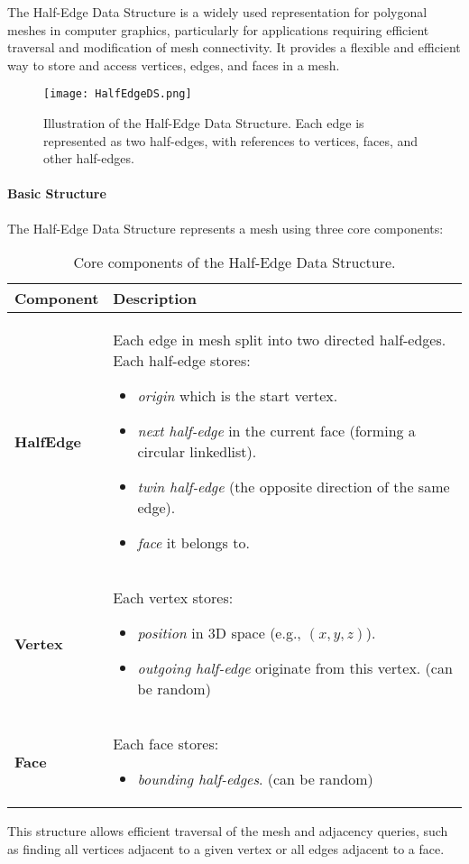 \documentclass[12pt]{extarticle}
\begin{document}
The Half-Edge Data Structure is a widely used representation for polygonal meshes in computer graphics, particularly for applications 
requiring efficient traversal and modification of mesh connectivity. It provides a flexible and efficient way to store and access vertices, 
edges, and faces in a mesh.

\begin{figure}[h]
    \centering
    \texttt{[image: HalfEdgeDS.png]}
    \caption{Illustration of the Half-Edge Data Structure. Each edge is represented as two half-edges, with references to vertices, 
    faces, and other half-edges.\cite{2019YinHalfEdgeBlog}}
    \label{fig:HalfEdgeDS}
\end{figure}

\paragraph{Basic Structure}
The Half-Edge Data Structure represents a mesh using three core components:
\begin{table}[h!]
    \centering
    \renewcommand{\arraystretch}{1.5}
    \begin{tabular}{|l|p{}|}
    \hline
    \textbf{Component} & \textbf{Description} \\ \hline
    \textbf{HalfEdge} & Each edge in mesh split into two directed half-edges. Each half-edge stores:
    \begin{itemize}
        \item \textit{origin} which is the start vertex.
        \item \textit{next half-edge} in the current face (forming a circular linkedlist).
        \item \textit{twin half-edge} (the opposite direction of the same edge).
        \item \textit{face} it belongs to.
    \end{itemize} \\ \hline
    \textbf{Vertex} & Each vertex stores:
    \begin{itemize}
        \item \textit{position} in 3D space (e.g., \((x, y, z)\)).
        \item \textit{outgoing half-edge} originate from this vertex. (can be random)
    \end{itemize} \\ \hline
    \textbf{Face} & Each face stores:
    \begin{itemize}
        \item \textit{bounding half-edges}. (can be random)
    \end{itemize} \\ \hline
    \end{tabular}
    \caption{Core components of the Half-Edge Data Structure.}
    \label{tab:halfedge_structure}
\end{table}
This structure allows efficient traversal of the mesh and adjacency queries, such as finding all vertices adjacent to a given vertex 
or all edges adjacent to a face.
\end{document}

